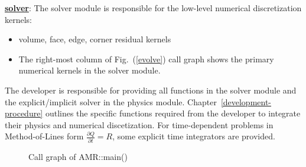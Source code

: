 \documentclass[11pt]{book}
\begin{document}
\noindent
\underline{\textbf{solver}}: The solver module is responsible for the low-level numerical discretization kernels:
\begin{itemize}
\item volume, face, edge, corner residual kernels
\item The right-most column of Fig.~(\ref{evolve}) call graph shows the primary numerical kernels in the solver module.
\end{itemize}

\noindent
The developer is responsible for providing all functions in the solver module and the explicit/implicit solver in the physics module.
Chapter~\ref{development-procedure} outlines the specific functions required from the developer to integrate their physics and numerical discetization.
For time-dependent problems in Method-of-Lines form $\frac{\partial Q}{\partial t} = R$, some explicit time integrators are provided.

\begin{figure}
 \begin{subfigmatrix}{2}%
 \end{subfigmatrix}
 \caption{Call graph of AMR::main()}
 \label{main}
\end{figure}
\end{document}
